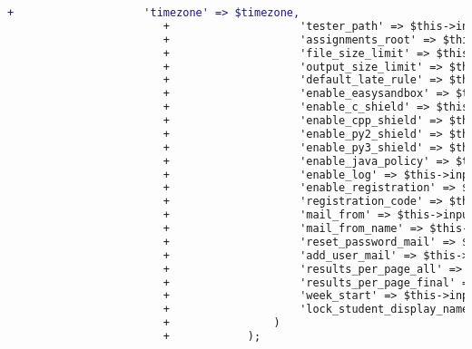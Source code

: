 \begin{lstlisting}[language=diff, caption=Perubahan pada kode Settings.php]
						+                    'timezone' => $timezone,
						+                    'tester_path' => $this->input->post('tester_path'),
						+                    'assignments_root' => $this->input->post('assignments_root'),
						+                    'file_size_limit' => $this->input->post('file_size_limit'),
						+                    'output_size_limit' => $this->input->post('output_size_limit'),
						+                    'default_late_rule' => $this->input->post('default_late_rule'),
						+                    'enable_easysandbox' => $this->input->post('enable_easysandbox') === null ? 0 : 1,
						+                    'enable_c_shield' => $this->input->post('enable_c_shield') === null ? 0 : 1,
						+                    'enable_cpp_shield' => $this->input->post('enable_cpp_shield') === null ? 0 : 1,
						+                    'enable_py2_shield' => $this->input->post('enable_py2_shield') === null ? 0 : 1,
						+                    'enable_py3_shield' => $this->input->post('enable_py3_shield') === null ? 0 : 1,
						+                    'enable_java_policy' => $this->input->post('enable_java_policy') === null ? 0 : 1,
						+                    'enable_log' => $this->input->post('enable_log') === null ? 0 : 1,
						+                    'enable_registration' => $this->input->post('enable_registration') === null ? 0 : 1,
						+                    'registration_code' => $this->input->post('registration_code'),
						+                    'mail_from' => $this->input->post('mail_from'),
						+                    'mail_from_name' => $this->input->post('mail_from_name'),
						+                    'reset_password_mail' => $this->input->post('reset_password_mail'),
						+                    'add_user_mail' => $this->input->post('add_user_mail'),
						+                    'results_per_page_all' => $this->input->post('rpp_all'),
						+                    'results_per_page_final' => $this->input->post('rpp_final'),
						+                    'week_start' => $this->input->post('week_start'),
						+                    'lock_student_display_name' => $this->input->post('lock_student_display_name') === null ? 0 : 1,
						+                )
						+            );
						

\end{lstlisting}
